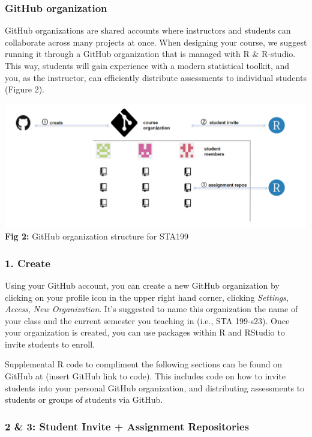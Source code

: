 \documentclass[
  12pt]{article}
\begin{document}
\hypertarget{github-organization}{%
\subsubsection{GitHub organization}\label{github-organization}}

GitHub organizations are shared accounts where instructors and students
can collaborate across many projects at once. When designing your
course, we suggest running it through a GitHub organization that is
managed with R \& R-studio. This way, students will gain experience with
a modern statistical toolkit, and you, as the instructor, can
efficiently distribute assessments to individual students (Figure 2).

\includegraphics{images/githuborg.png} \textbf{Fig 2:} GitHub
organization structure for STA199

\hypertarget{create}{%
\subsubsection{1. Create}\label{create}}

Using your GitHub account, you can create a new GitHub organization by
clicking on your profile icon in the upper right hand corner, clicking
\emph{Settings}, \emph{Access}, \emph{New Organization}. It's suggested
to name this organization the name of your class and the current
semester you teaching in (i.e., STA 199-s23). Once your organization is
created, you can use packages within R and RStudio to invite students to
enroll.

Supplemental R code to compliment the following sections can be found on
GitHub at (insert GitHub link to code). This includes code on how to
invite students into your personal GitHub organization, and distributing
assessments to students or groups of students via GitHub.

\hypertarget{student-invite-assignment-repositories}{%
\subsubsection{2 \& 3: Student Invite + Assignment
Repositories}\label{student-invite-assignment-repositories}}
\end{document}
